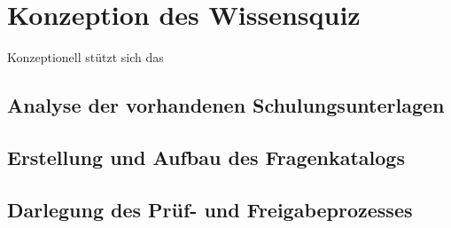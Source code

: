 \chapter{Konzeption des Wissensquiz}
Konzeptionell stützt sich das 
\section{Analyse der vorhandenen Schulungsunterlagen}
\section{Erstellung und Aufbau des Fragenkatalogs}
\section{Darlegung des Prüf- und Freigabeprozesses}
